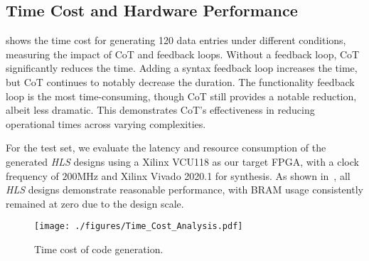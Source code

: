 \subsection{Time Cost and Hardware Performance}\label{subsec:exp_timecost}

 shows the time cost for generating 120 data entries under different conditions, measuring the impact of CoT and feedback loops. Without a feedback loop, CoT significantly reduces the time. Adding a syntax feedback loop increases the time, but CoT continues to notably decrease the duration. The functionality feedback loop is the most time-consuming, though CoT still provides a notable reduction, albeit less dramatic. This demonstrates CoT's effectiveness in reducing operational times across varying complexities.

For the test set,
we evaluate the latency and resource consumption of the generated \textit{HLS} designs using a Xilinx VCU118 as our target FPGA, with a clock frequency of $200$MHz and Xilinx Vivado 2020.1 for synthesis.
As shown in~, all \textit{HLS} designs demonstrate reasonable performance, with BRAM usage consistently remained at zero due to the design scale.

\begin{figure}
    \centering
    \texttt{[image: ./figures/Time\_Cost\_Analysis.pdf]}
    \vspace{-2mm}
    \caption{Time cost of code generation.}
    \label{fig:time_cost}
\end{figure}


\begin{table}[htb]
\centering
\caption{Latency and resource usage of LLM-generated designs synthesized on a VCU118 FPGA.}
\label{tb:perf_resource}
\setlength\tabcolsep{1pt} 
\end{table}

